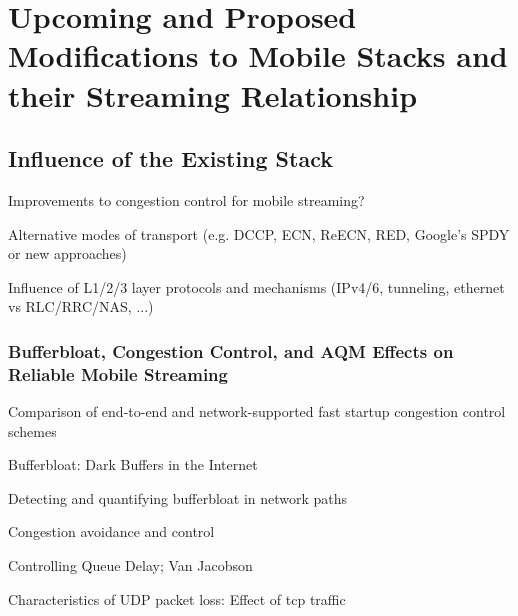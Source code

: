 

\section{Upcoming and Proposed Modifications to Mobile Stacks and their Streaming Relationship}
\label{c5:sec:stack-enhancements}














\subsection{Influence of the Existing Stack}

Improvements to congestion control for mobile streaming?

 Alternative modes of transport (e.g. DCCP, ECN, ReECN, RED, Google's SPDY or new approaches)

 Influence of L1/2/3 layer protocols and mechanisms (IPv4/6, tunneling, ethernet vs RLC/RRC/NAS, ...)


\subsubsection{Bufferbloat, Congestion Control, and AQM Effects on Reliable Mobile Streaming}

Comparison of end-to-end and network-supported fast startup congestion control schemes \cite{scharf2011comparison}

Bufferbloat: Dark Buffers in the Internet \cite{gettys2011bufferbloat}

Detecting and quantifying bufferbloat in network paths \cite{groenewegen2011detecting}

Congestion avoidance and control \cite{jacobson1988congestion}

Controlling Queue Delay; Van Jacobson \cite{Nichols:2012:CQD:2209249.2209264}


Characteristics of UDP packet loss: Effect of tcp traffic \cite{sawashima97characteristics}



